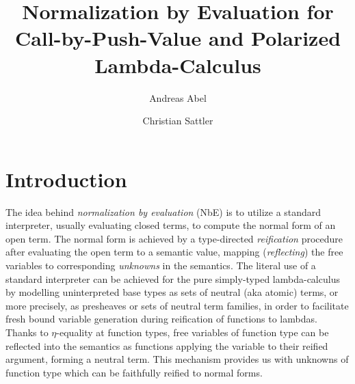 \documentclass[a4paper,USenglish,cleveref, autoref]{lipics-v2019}
\title{Normalization by Evaluation for Call-by-Push-Value and Polarized Lambda-Calculus}
\author{Andreas Abel}
  {Department of Computer Science and Engineering,
    Chalmers and Gothenburg University,
    Sweden \and
    \url{www.cse.chalmers.se/~abela}
  }
  {andreas.abel@gu.se}
  {https://orcid.org/0000-0003-0420-4492}
  {VR Grant 2014-04864 \emph{Termination
      Certificates for Dependently-Typed Programs and Proofs via
      Refinement Types}
  }
\author{Christian Sattler}
  {Department of Computer Science and Engineering,
    Chalmers and Gothenburg University,
    Sweden
  }
  {}%
  {}%
  {}%
\begin{document}
\maketitle

\begin{abstract}

\end{abstract}


\section{Introduction}
\label{sec:intro}

The idea behind \emph{normalization by evaluation} (NbE) is to utilize a
standard interpreter, usually evaluating closed terms, to compute the
normal form of an open term.
The normal form is achieved by a type-directed \emph{reification}
procedure after evaluating the open term to a semantic value, mapping
(\emph{reflecting})
the free variables to corresponding \emph{unknowns} in the semantics.
The literal use of a standard interpreter
can be achieved for the pure simply-typed lambda-calculus
\cite{bergerSchwichtenberg:lics91,filinski:semaccounttdpe}
by modelling uninterpreted base types as sets of neutral (aka atomic)
terms, or more precisely, as presheaves or sets of neutral term
families, in order to facilitate fresh bound variable generation during
reification of functions to lambdas.
Thanks to $\eta$-equality at function types, free variables of
function type can be reflected into the semantics as functions
applying the variable to their reified argument,
forming a neutral term.  This mechanism provides us with unknowns of
function type which can be faithfully reified to normal forms.
\end{document}
